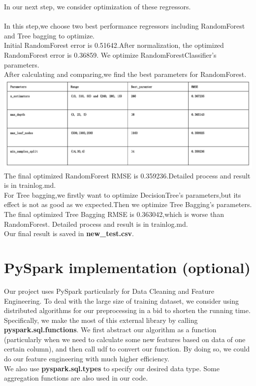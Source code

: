 \documentclass{article}
\begin{document}
In our next step, we consider optimization of these regressors.
\\
\\In this step,we choose two best performance regressors including RandomForest and Tree bagging to optimize.
\\Initial RandomForest error is 0.51642.After normalization, the optimized RandomForest error is 0.36859.
We optimize RandomForestClassifier's parameters.
\\After calculating and comparing,we find the best parameters for RandomForest.\\
\includegraphics[width=1\linewidth]{optimization.png}
The final optimized RandomForest RMSE is 0.359236.Detailed process and result is in trainlog.md.
\\For Tree bagging,we firstly want to optimize DecisionTree's parameters,but its effect is not as good as we expected.Then we optimize Tree Bagging's parameters.
\\The final optimized Tree Bagging RMSE is 0.363042,which is worse than RandomForest. Detailed process and result is in trainlog.md.\\
Our final result is saved in \textbf{new\_test.csv}.\\


\section{PySpark implementation (optional)}
Our project uses PySpark particularly for Data Cleaning and Feature Engineering. To deal with the large size of training dataset,
we consider using distributed algorithms for our preprocessing in a bid to shorten the running time.\\
Specifically, we make the most of this external library by calling \textbf{pyspark.sql.functions}. We first abstract our algorithm as a function
(particularly when we need to calculate some new features based on data of one certain column), and then call udf to convert our function.
By doing so, we could do our feature engineering with much higher efficiency.\\
We also use \textbf{pyspark.sql.types} to specify our desired data type.
Some aggregation functions are also used in our code.
\end{document}
